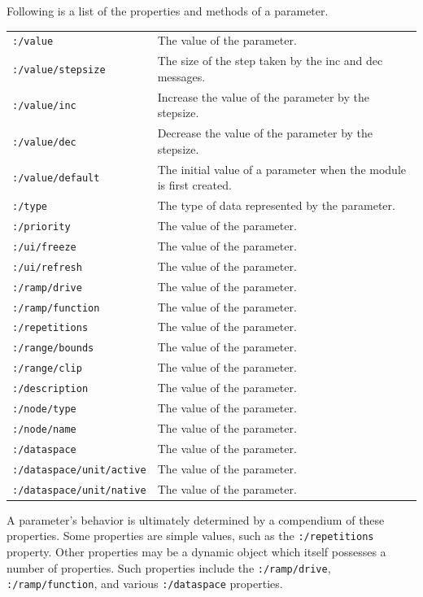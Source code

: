 \documentclass{article}
\begin{document}
Following is a list of the properties and methods of a parameter.
\begin{center} 
{\footnotesize
\begin{tabular}{ll}
	\texttt{:/value} & The value of the parameter. \\
	\texttt{:/value/stepsize} & The size of the step taken by the inc and dec messages. \\
	\texttt{:/value/inc} & Increase the value of the parameter by the stepsize. \\
	\texttt{:/value/dec} & Decrease the value of the parameter by the stepsize. \\
	\texttt{:/value/default} & The initial value of a parameter when the module is first created. \\
	\texttt{:/type} & The type of data represented by the parameter. \\
	\texttt{:/priority} & The value of the parameter. \\
	\texttt{:/ui/freeze} & The value of the parameter. \\
	\texttt{:/ui/refresh} & The value of the parameter. \\
	\texttt{:/ramp/drive} & The value of the parameter. \\
	\texttt{:/ramp/function} & The value of the parameter. \\
	\texttt{:/repetitions} & The value of the parameter. \\
	\texttt{:/range/bounds} & The value of the parameter. \\
	\texttt{:/range/clip} & The value of the parameter. \\
	\texttt{:/description} & The value of the parameter. \\
	\texttt{:/node/type} & The value of the parameter. \\
	\texttt{:/node/name} & The value of the parameter. \\
	\texttt{:/dataspace} & The value of the parameter. \\
	\texttt{:/dataspace/unit/active} & The value of the parameter. \\
	\texttt{:/dataspace/unit/native} & The value of the parameter. \\
\end{tabular} } 
\end{center}  

A parameter's behavior is ultimately determined by a compendium of these properties. Some properties are simple values, such as the \texttt{:/repetitions} property. Other properties may be a dynamic object which itself possesses a number of properties.  Such properties include the \texttt{:/ramp/drive}, \texttt{:/ramp/function}, and various \texttt{:/dataspace} properties.
\end{document}

